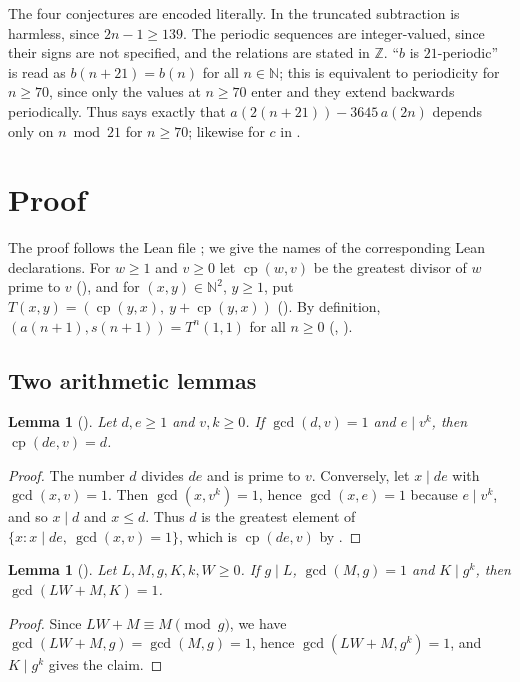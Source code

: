 \documentclass[11pt]{amsart}
\theoremstyle{plain}
\newtheorem{lemma}[theorem]{Lemma}
\theoremstyle{definition}
\newcommand{\N}{\mathbb{N}}
\newcommand{\Z}{\mathbb{Z}}
\newcommand{\cp}{\operatorname{cp}}
\begin{document}
The four conjectures are encoded literally. In  the truncated subtraction is harmless, since $2n-1\ge139$. The periodic sequences are integer-valued, since their signs are not specified, and the relations are stated in $\Z$. ``$b$ is $21$-periodic'' is read as $b(n+21)=b(n)$ for all $n\in\N$; this is equivalent to periodicity for $n\ge70$, since only the values at $n\ge70$ enter and they extend backwards periodically. Thus  says exactly that $a(2(n+21))-3645\,a(2n)$ depends only on $n\bmod21$ for $n\ge70$; likewise for $c$ in .

\section{Proof}\label{sec:proof}

The proof follows the Lean file ; we give the names of the corresponding Lean declarations.
For $w\ge1$ and $v\ge0$ let $\cp(w,v)$ be the greatest divisor of $w$ prime to $v$ (), and for $(x,y)\in\N^2$, $y\ge1$, put $T(x,y)=(\cp(y,x),\ y+\cp(y,x))$ (). By definition, $(a(n+1),s(n+1))=T^n(1,1)$ for all $n\ge0$ (, ).

\subsection{Two arithmetic lemmas}

\begin{lemma}[]\label{lem:cp}
Let $d,e\ge1$ and $v,k\ge0$. If $\gcd(d,v)=1$ and $e\mid v^k$, then $\cp(de,v)=d$.
\end{lemma}

\begin{proof}
The number $d$ divides $de$ and is prime to $v$. Conversely, let $x\mid de$ with $\gcd(x,v)=1$. Then $\gcd(x,v^k)=1$, hence $\gcd(x,e)=1$ because $e\mid v^k$, and so $x\mid d$ and $x\le d$. Thus $d$ is the greatest element of $\{x: x\mid de,\ \gcd(x,v)=1\}$, which is $\cp(de,v)$ by .
\end{proof}

\begin{lemma}[]\label{lem:lin}
Let $L,M,g,K,k,W\ge0$. If $g\mid L$, $\gcd(M,g)=1$ and $K\mid g^k$, then $\gcd(LW+M,K)=1$.
\end{lemma}

\begin{proof}
Since $LW+M\equiv M\pmod g$, we have $\gcd(LW+M,g)=\gcd(M,g)=1$, hence $\gcd(LW+M,g^k)=1$, and $K\mid g^k$ gives the claim.
\end{proof}
\end{document}
